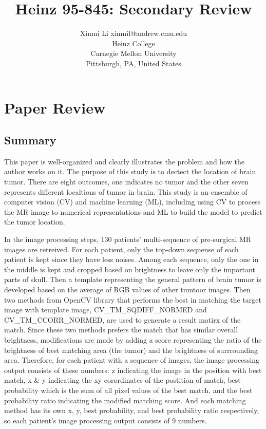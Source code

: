 \documentclass[twoside,11pt]{article}
\begin{document}
\title{Heinz 95-845: Secondary Review}

\author{\name Xinmi Li \email xinmil@andrew.cmu.edu \\
       \addr Heinz College\\
       Carnegie Mellon University\\
       Pittsburgh, PA, United States} 

\maketitle


\section{Paper Review}
\subsection{Summary}
This paper is well-organized and clearly illustrates the problem and how the author works on it. The purpose of this study is to dectect the location of brain tumor. There are eight outcomes, one indicates no tumor and the other seven represents different localtions of tumor in brain. This study is an ensemble of computer vision (CV) and machine learning (ML), including using CV to process the MR image to numerical representations and ML to build the model to predict the tumor location.

In the image processing steps, 130 patients' multi-sequence of pre-surgical MR images are retreived. For each patient, only the top-down sequense of each patient is kept since they have less noises. Among each sequence, only the one in the middle is kept and cropped based on brightness to leave only the important parts of skull. Then a template representing the general pattern of brain tumor is developed based on the average of RGB values of other tumtoor images. Then two methods from OpenCV library that performs the best in matching the target image with template image, CV\_TM\_SQDIFF\_NORMED and CV\_TM\_CCORR\_NORMED, are used to generate a result matirx of the match. Since these two methods prefers the match that has similar overall brightness, modifications are made by adding a score representing the ratio of the brightness of best matching area (the tumor) and the brightness of surrrounding area. Therefore, for each patient with a sequence of images, the image processing output consists of these numbers: z indicating the image in the position with best match, x \& y indicating the xy corordinates of the postition of match, best probability which is the sum of all pixel values of the best match, and the best probability ratio indicating the modified matching score. And each matching method has its own x, y, best probability, and best probability ratio respectively, so each patient's image processing output consists of 9 numbers.
\end{document}
